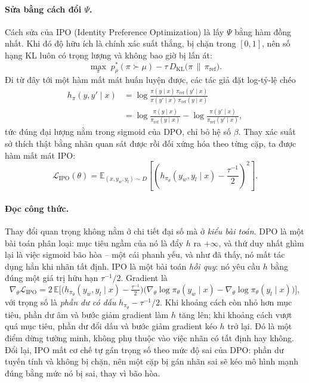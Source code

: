 \paragraph{Sửa bằng cách đổi \( \Psi \).}
Cách sửa của IPO (Identity Preference Optimization) là lấy \( \Psi \) bằng hàm đồng nhất. Khi đó độ hữu ích là chính xác suất thắng, bị chặn trong \( [0,1] \), nên số hạng KL luôn có trọng lượng và không bao giờ bị lấn át:
\[
    \max_{\pi}\; p^{*}_{\rho}(\pi \succ \mu) - \tau\, D_{\text{KL}}\big(\pi \,\|\, \pi_{\text{ref}}\big).
\]
Đi từ đây tới một hàm mất mát huấn luyện được, các tác giả đặt log-tỷ-lệ chéo
\[
\begin{aligned}
    h_{\pi}(y, y' \mid x)
    &= \log \frac{\pi(y \mid x)\,\pi_{\text{ref}}(y' \mid x)}{\pi(y' \mid x)\,\pi_{\text{ref}}(y \mid x)} \\[4pt]
    &= \log\frac{\pi(y\mid x)}{\pi_{\text{ref}}(y\mid x)} - \log\frac{\pi(y'\mid x)}{\pi_{\text{ref}}(y'\mid x)},
\end{aligned}
\]
tức đúng đại lượng nằm trong sigmoid của DPO, chỉ bỏ hệ số \( \beta \). Thay xác suất sở thích thật bằng nhãn quan sát được rồi đối xứng hóa theo từng cặp, ta được hàm mất mát IPO:
\[
    \mathcal{L}_{\text{IPO}}(\theta)
    = \mathbb{E}_{(x, y_w, y_l) \sim D}
    \left[
        \left( h_{\pi_\theta}(y_w, y_l \mid x) - \frac{\tau^{-1}}{2} \right)^{2}
    \right].
\]

\paragraph{Đọc công thức.}
Thay đổi quan trọng không nằm ở chi tiết đại số mà ở \emph{kiểu bài toán}. DPO là một bài toán phân loại: mục tiêu ngầm của nó là đẩy \( h \) ra \( +\infty \), và thứ duy nhất ghìm lại là việc sigmoid bão hòa -- một cái phanh yếu, và như đã thấy, nó mất tác dụng hẳn khi nhãn tất định. IPO là một bài toán \emph{hồi quy}: nó yêu cầu \( h \) bằng đúng một giá trị hữu hạn \( \tau^{-1}/2 \). Gradient là
\[
    \nabla_{\theta}\mathcal{L}_{\text{IPO}}
    = 2\,\mathbb{E}\Big[
        \big( h_{\pi_\theta}(y_w, y_l \mid x) - \tfrac{\tau^{-1}}{2} \big)
        \big( \nabla_{\theta}\log\pi_{\theta}(y_w \mid x) - \nabla_{\theta}\log\pi_{\theta}(y_l \mid x) \big)
    \Big],
\]
với trọng số là \emph{phần dư có dấu} \( h_{\pi_\theta} - \tau^{-1}/2 \). Khi khoảng cách còn nhỏ hơn mục tiêu, phần dư âm và bước giảm gradient làm \( h \) tăng lên; khi khoảng cách vượt quá mục tiêu, phần dư đổi dấu và bước giảm gradient kéo \( h \) trở lại. Đó là một điểm dừng tường minh, không phụ thuộc vào việc nhãn có tất định hay không. Đổi lại, IPO mất cơ chế tự gán trọng số theo mức độ sai của DPO: phần dư tuyến tính và không bị chặn, nên một cặp bị gán nhãn sai sẽ kéo mô hình mạnh đúng bằng mức nó bị sai, thay vì bão hòa.

